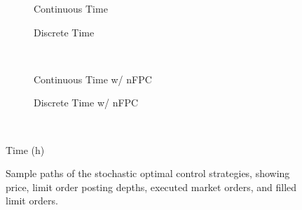 \begin{figure}%
\centering%
\begin{subfigure}[b]{.4\linewidth}%
  \setlength\figureheight{\linewidth}%
  \setlength\figurewidth{\linewidth}%
  \caption{Continuous Time}%
\end{subfigure}%
\hspace{1.5cm}%
\begin{subfigure}[b]{.4\linewidth}%
  \setlength\figureheight{\linewidth}%
  \setlength\figurewidth{\linewidth}%
  \caption{Discrete Time}%
\end{subfigure}\\%
\vspace{1cm}%
\begin{subfigure}[b]{.4\linewidth}%
  \setlength\figureheight{\linewidth}%
  \setlength\figurewidth{\linewidth}%
  \caption{Continuous Time w/ nFPC}%
\end{subfigure}%
\hspace{1.5cm}%
\begin{subfigure}[b]{.4\linewidth}%
  \setlength\figureheight{\linewidth}%
  \setlength\figurewidth{\linewidth}%
  \caption{Discrete Time w/ nFPC}%
\end{subfigure}\\%
\leavevmode{}\hspace{0pt plus 1filll}\null%

Time (h)

\vspace{1cm}%
\begin{subfigure}{\linewidth}%
  \centering%
  \setlength\figureheight{\linewidth}%
  \setlength\figurewidth{\linewidth}%
\end{subfigure}%
  \caption[Detailed sample paths of the stochastic optimal control strategies]{Sample paths of the stochastic optimal control strategies, showing price, limit order posting depths, executed market orders, and filled limit orders.}\label{fig:samplepath_paths}%
\end{figure}

